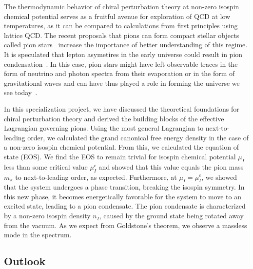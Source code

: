 The thermodynamic behavior of chiral perturbation theory at non-zero isospin chemical potential serves as a fruitful avenue for exploration of QCD at low temperatures, as it can be compared to calculations from first principles using lattice QCD.
The recent proposals that pions can form compact stellar objects called pion stars~\cite{new_clas_of_compact_stars,andersen:bose_einstein} increase the importance of better understanding of this regime.
It is speculated that lepton asymetires in the early universe could result in pion condensation~\cite{new_clas_of_compact_stars,abduki:Pion_condensation_in_a_dense_neutrino_gas,Wygas:Cosmic_QCD_Epoch_at_Nonvanishing_Lepton_Asymmetry,Schwarz_2009:Lepton_asymmetry_and_the_cosmic_QCD_transition}.
In this case, pion stars might have left observable traces in the form of neutrino and photon spectra from their evaporation or in the form of gravitational waves and can have thus played a role in forming the universe we see today~\cite{new_clas_of_compact_stars}.

In this specialization project, we have discussed the theoretical foundations for chiral perturbation theory and derived the building blocks of the effective Lagrangian governing pions.
Using the most general Lagrangian to next-to-leading order, we calculated the grand canonical free energy density in the case of a non-zero isospin chemical potential.
From this, we calculated the equation of state (EOS).
We find the EOS to remain trivial for isospin chemical potential $\mu_I$ less than some critical value $\mu_I^c$ and showed that this value equals the pion mass $m_\pi$ to next-to-leading order, as expected.
Furthermore, at $\mu_I = \mu_I^c$, we showed that the system undergoes a phase transition, breaking the isospin symmetry.
In this new phase, it becomes energetically favorable for the system to move to an excited state, leading to a pion condensate.
The pion condensate is characterized by a non-zero isospin density $n_I$, caused by the ground state being rotated away from the vacuum.
As we expect from Goldstone's theorem, we observe a massless mode in the spectrum.


\subsection*{Outlook}

